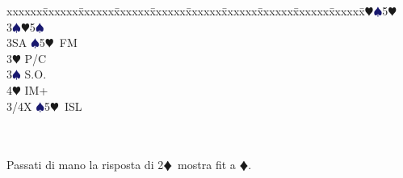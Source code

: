 \documentclass[a4paper,italian]{article}
\newcommand{\BD}{\textcolor{RedOrange}{$\vardiamondsuit$}}
\newcommand{\BH}{\textcolor{Red2}{$\varheartsuit${}}}
\newcommand{\BS}{\textcolor{MidnightBlue}{$\spadesuit${}}}
\newenvironment{bidtable}
{\begin{tabbing}

    xxxxxx\=xxxxxx\=xxxxxx\=xxxxxx\=xxxxxx\=xxxxxx\=xxxxxx\=xxxxxx\=xxxxxx\=xxxxxx\=\kill}
{\end{tabbing} }%
\begin{document}
\begin{multicols}{2}
\begin{bidtable}
                                            3\BH {}\BS 5\BH \\
                                            3\BS {}\BH 5\BS \\
                                            3SA \BS 5\BH\ FM\-\\
                                            3\BH \> P/C\+\\
                                            3\BS \> S.O.\\
                                            4\BH \> IM+\\
                                            3/4X \BS 5\BH\ ISL\-\\
                                            \\
                                            \\
                                        \end{bidtable}
                                        Passati di mano la risposta di 2\BD\ mostra fit a \BD.
                                    \end{multicols}
\end{document}
